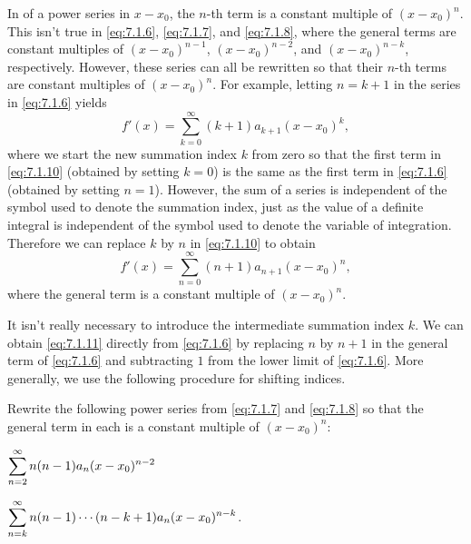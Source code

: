 In  of a power series in $x-x_0$, the $n$-th
term is a constant multiple of $(x-x_0)^n$. This isn't  true in
\eqref{eq:7.1.6}, \eqref{eq:7.1.7}, and \eqref{eq:7.1.8}, where the general
terms are constant multiples of $(x-x_0)^{n-1}$, $(x-x_0)^{n-2}$, and
$(x-x_0)^{n-k}$, respectively. However, these series can all be
rewritten so that their $n$-th terms are constant multiples of
$(x-x_0)^n$. For example, letting $n=k+1$ in the series in
\eqref{eq:7.1.6} yields
\begin{equation} \label{eq:7.1.10}
f'(x)=\sum_{k=0}^\infty (k+1)a_{k+1}(x-x_0)^k,
\end{equation}
where we start the new summation index $k$ from zero so
that the first
term in \eqref{eq:7.1.10} (obtained by setting $k=0$) is the same as the
first term in \eqref{eq:7.1.6} (obtained by setting $n=1$). However, the
sum of a series is independent of the symbol used to denote the
summation index, just as the value of a definite integral is
independent of the symbol used to denote the variable of integration.
Therefore we can replace $k$ by $n$ in \eqref{eq:7.1.10} to obtain
\begin{equation} \label{eq:7.1.11}
f'(x)=\sum_{n=0}^\infty (n+1)a_{n+1}(x-x_0)^n,
\end{equation}
where the general term is a  constant multiple of  $(x-x_0)^n$.

It isn't  really necessary to introduce the intermediate summation
index $k$. We can obtain \eqref{eq:7.1.11} directly from \eqref{eq:7.1.6}
by replacing $n$ by $n+1$ in the general term of \eqref{eq:7.1.6} and
subtracting $1$ from the lower limit of \eqref{eq:7.1.6}. More generally,
we use the following procedure for shifting indices.




\begin{example}\label{example:7.1.3}
Rewrite the following power series from \eqref{eq:7.1.7}  and \eqref{eq:7.1.8}
so that the general term in each  is a  constant multiple of
$(x-x_0)^n$:
\begin{enumext*}[columns=2,label=\alph*,wrap-label={(#1)},labelwidth=2em,list-offset=3em]
\item$\displaystyle\sum_{n=2}^\infty n(n-1)a_n(x-x_0)^{n-2}$
\item$\displaystyle\sum_{n=k}^\infty n(n-1)\cdots(n-k+1)a_n(x-x_0)^{n-k}$.
\end{enumext*}
\end{example}

